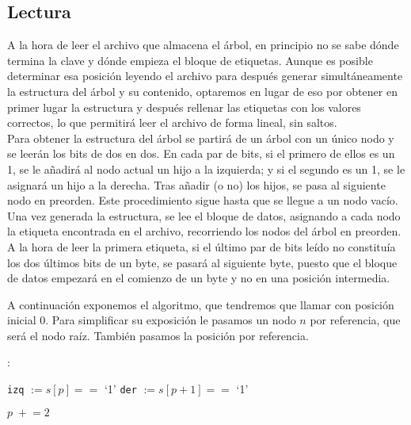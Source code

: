 \documentclass{article}
\newenvironment{algo}{
\vspace*{0.5cm}
\begin{algorithm}[H]}{
\end{algorithm}
\vspace*{0.5cm}
}
\begin{document}
\subsection{Lectura}

A la hora de leer el archivo que almacena el árbol, en principio no se sabe dónde
termina la clave y dónde empieza el bloque de etiquetas. Aunque es posible
determinar esa posición leyendo el archivo para después generar simultáneamente la
estructura del árbol y su contenido, optaremos en lugar de eso por obtener en
primer lugar la estructura y después rellenar las etiquetas con los valores
correctos, lo que permitirá leer el archivo de forma lineal, sin saltos. \\

Para obtener la estructura del árbol se partirá de un árbol con un único nodo y se
leerán los bits de dos en dos. En cada par de bits, si el primero de ellos es un
1, se le añadirá al nodo actual un hijo a la izquierda; y si el segundo es un 1,
se le asignará un hijo a la derecha. Tras añadir (o no) los hijos, se pasa al
siguiente nodo en preorden. Este procedimiento sigue hasta que se llegue a un nodo
vacío. \\

Una vez generada la estructura, se lee el bloque de datos, asignando a cada nodo la
etiqueta encontrada en el archivo, recorriendo los nodos del árbol en preorden. A
la hora de leer la primera etiqueta, si el último par de bits leído no constituía
los dos últimos bits de un byte, se pasará al siguiente byte, puesto que el bloque
de datos empezará en el comienzo de un byte y no en una posición intermedia.

A continuación exponemos el algoritmo, que tendremos que llamar con posición inicial 0.
Para simplificar su exposición le pasamos un nodo $n$ por referencia, que será
el nodo raíz. También pasamos la posición por referencia.

\begin{algo}
: \\

\BlankLine

\texttt{izq} $ := s[p] == $ `1'\;
\texttt{der} $ := s[p+1] == $ `1'\;
\BlankLine


\BlankLine

$p \;+\!\!= 2$\;

\BlankLine


\end{algo}
\end{document}
